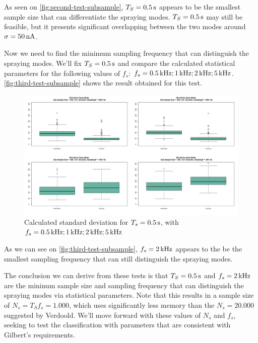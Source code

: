 \documentclass[oneside,12pt]{article}
\begin{document}
As seen on \autoref{fig:second-test-subsample}, $T_S = 0.5 \,\mathrm{s}$ appears to be the smallest sample size that can differentiate the spraying modes.
$T_S = 0.5 \,\mathrm{s}$ may still be feasible, but it presents significant overlapping between the two modes around $\sigma = 50 \,\mathrm{nA}$.

Now we need to find the minimum sampling frequency that can distinguish the spraying modes. We'll fix $T_S = 0.5 \,\mathrm{s}$ and compare the calculated 
statistical parameters for the following values of $f_s$: $f_s = 0.5 \,\mathrm{kHz}; 1 \,\mathrm{kHz}; 2 \,\mathrm{kHz}; 5 \,\mathrm{kHz}$. \autoref{fig:third-test-subsample}
shows the result obtained for this test.

\begin{figure}[h!]
    \centering
    \includegraphics[width=1\textwidth,trim=1 1 1 1,clip]{figures/third-test-subsample.png}
    \caption{Calculated standard deviation for $T_s = 0.5 \,\mathrm{s}$, with $f_s = 0.5 \,\mathrm{kHz}; 1 \,\mathrm{kHz}; 2 \,\mathrm{kHz}; 5 \,\mathrm{kHz}$}
    \label{fig:third-test-subsample}
\end{figure}

As we can see on \autoref{fig:third-test-subsample}, $f_s = 2 \,\mathrm{kHz}$ appears to the be the smallest sampling frequency that can still distinguish the spraying  
modes. 

The conclusion we can derive from these tests is that $T_S = 0.5 \,\mathrm{s}$ and $f_s = 2 \,\mathrm{kHz}$ are the mininum sample size and sampling frequency that
can distinguish the spraying modes via statistical parameters. Note that this results in a sample size of $N_s = T_S f_s = 1.000$, which uses 
significantly less memory than the $N_s = 20.000$ suggested by Verdoold. We'll move forward with these values of $N_s$ and $f_s$, seeking to test the classification
with parameters that are consistent with Gilbert's requirements.
\end{document}
